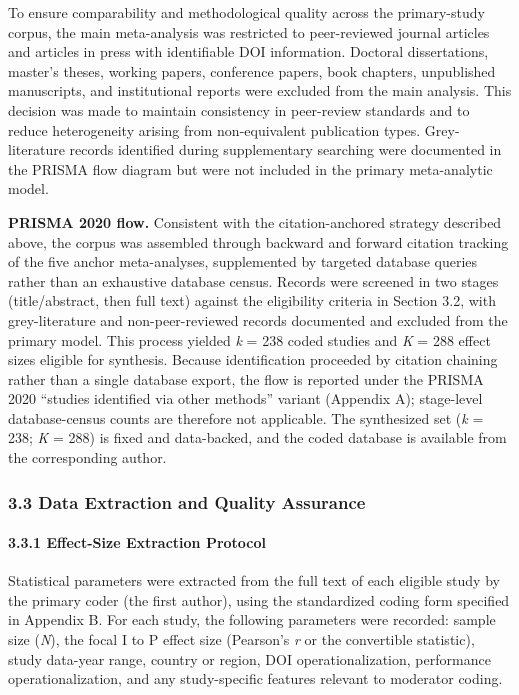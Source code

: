 \documentclass[
  12pt,a4paper]{article}
\begin{document}
To ensure comparability and methodological quality across the
primary-study corpus, the main meta-analysis was restricted to
peer-reviewed journal articles and articles in press with identifiable
DOI information. Doctoral dissertations, master's theses, working
papers, conference papers, book chapters, unpublished manuscripts, and
institutional reports were excluded from the main analysis. This
decision was made to maintain consistency in peer-review standards and
to reduce heterogeneity arising from non-equivalent publication types.
Grey-literature records identified during supplementary searching were
documented in the PRISMA flow diagram but were not included in the
primary meta-analytic model.

\textbf{PRISMA 2020 flow.} Consistent with the citation-anchored
strategy described above, the corpus was assembled through backward and
forward citation tracking of the five anchor meta-analyses, supplemented
by targeted database queries rather than an exhaustive database census.
Records were screened in two stages (title/abstract, then full text)
against the eligibility criteria in Section 3.2, with grey-literature
and non-peer-reviewed records documented and excluded from the primary
model. This process yielded \emph{k} = 238 coded studies and \emph{K} =
288 effect sizes eligible for synthesis. Because identification
proceeded by citation chaining rather than a single database export, the
flow is reported under the PRISMA 2020 ``studies identified via other
methods'' variant (Appendix A); stage-level database-census counts are
therefore not applicable. The synthesized set (\emph{k} = 238; \emph{K}
= 288) is fixed and data-backed, and the coded database is available
from the corresponding author.

\hypertarget{data-extraction-and-quality-assurance}{%
\subsubsection{3.3 Data Extraction and Quality
Assurance}\label{data-extraction-and-quality-assurance}}

\hypertarget{effect-size-extraction-protocol}{%
\paragraph{3.3.1 Effect-Size Extraction
Protocol}\label{effect-size-extraction-protocol}}

Statistical parameters were extracted from the full text of each
eligible study by the primary coder (the first author), using the
standardized coding form specified in Appendix B. For each study, the
following parameters were recorded: sample size (\emph{N}), the focal I
to P effect size (Pearson's \emph{r} or the convertible statistic),
study data-year range, country or region, DOI operationalization,
performance operationalization, and any study-specific features relevant
to moderator coding.
\end{document}
